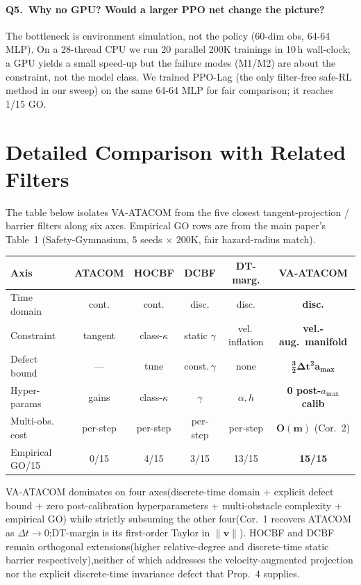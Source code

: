 \documentclass[letterpaper]{article}
\begin{document}
\paragraph{Q5.\ Why no GPU? Would a larger PPO net change the picture?}
The bottleneck is environment simulation, not the policy (60-dim obs, 64-64 MLP). On a 28-thread CPU we run 20 parallel 200K trainings in 10\,h wall-clock; a GPU yields a small speed-up but the failure modes (M1/M2) are about the constraint, not the model class. We trained PPO-Lag (the only filter-free safe-RL method in our sweep) on the same 64-64 MLP for fair comparison; it reaches 1/15 GO.

\section{Detailed Comparison with Related Filters}
\label{sec:related-detail}

The table below isolates VA-ATACOM from the five closest tangent-projection / barrier filters along six axes. Empirical GO rows are from the main paper's Table~1 (Safety-Gymnasium, $5$ seeds $\times$ $200$K, fair hazard-radius match).

\begin{table}[h]
\centering
\setlength{\tabcolsep}{3pt}
\small
\begin{tabular}{lccccc}
\toprule
Axis & ATACOM & HOCBF & DCBF & DT-marg. & \textbf{VA-ATACOM}\\
\midrule
Time domain & cont. & cont. & disc. & disc. & \textbf{disc.}\\
Constraint  & tangent & class-$\kappa$ & static $\gamma$ & vel.\,inflation & \textbf{vel.-aug.\ manifold}\\
Defect bound & — & tune & const.\,$\gamma$ & none & $\boldsymbol{\tfrac{3}{2}\Delta t^2 a_{\max}}$\\
Hyper-params & gains & class-$\kappa$ & $\gamma$ & $\alpha,h$ & \textbf{0 post-$a_{\max}$ calib}\\
Multi-obs. cost & per-step & per-step & per-step & per-step & $\boldsymbol{O(m)}$ (Cor.~2)\\
\midrule
Empirical GO/15 & 0/15 & 4/15 & 3/15 & 13/15 & \textbf{15/15}\\
\bottomrule
\end{tabular}
\end{table}

VA-ATACOM dominates on four axes(discrete-time domain $+$ explicit defect bound $+$ zero post-calibration hyperparameters $+$ multi-obstacle complexity $+$ empirical GO) while strictly subsuming the other four(Cor.~1 recovers ATACOM as $\Delta t{\to}0$;DT-margin is its first-order Taylor in $\|\boldsymbol v\|$). HOCBF and DCBF remain orthogonal extensions(higher relative-degree and discrete-time static barrier respectively),neither of which addresses the velocity-augmented projection nor the explicit discrete-time invariance defect that Prop.~4 supplies.
\end{document}

